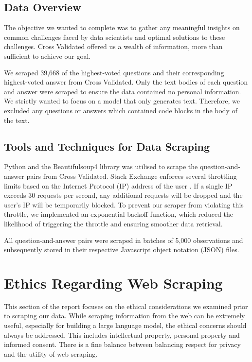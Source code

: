 \documentclass[10pt]{article}
\begin{document}
\subsection{Data Overview}

The objective we wanted to complete was to gather any meaningful insights on common challenges
faced by data scientists and optimal solutions to these challenges. Cross Validated offered us a wealth of
information, more than sufficient to achieve our goal.

We scraped 39,668 of the highest-voted questions and their corresponding highest-voted answer from Cross Validated.
Only the text bodies of each question and answer were scraped to ensure the data contained no personal information.
We strictly wanted to focus on a model that only generates text. Therefore, we excluded any questions or answers
which contained code blocks in the body of the text.

\subsection{Tools and Techniques for Data Scraping}

Python and the Beautifulsoup4 library \cite{beautifulsoup} was utilised to scrape the question-and-answer pairs
from Cross Validated. Stack Exchange enforces several throttling limits based on the Internet Protocol (IP)
address of the user \cite{stackexchange-throttle}. If a single IP exceeds 30 requests per second, 
any additional requests will be dropped and the user's IP will be temporarily blocked. To prevent our scraper from
violating this throttle, we implemented an exponential backoff function, which reduced the likelihood of
triggering the throttle and ensuring smoother data retrieval.

All question-and-answer pairs were scraped in batches of 5,000 observations and subsequently
stored in their respective Javascript object notation (JSON) files.

\section{Ethics Regarding Web Scraping}

This section of the report focuses on the ethical considerations we examined prior to scraping our data.
While scraping information from the web can be extremely useful, especially for building a large language
model, the ethical concerns should always be addressed. This includes intellectual property, personal
property and informed consent. There is a fine balance between balancing respect for privacy and the
utility of web scraping.
\end{document}
